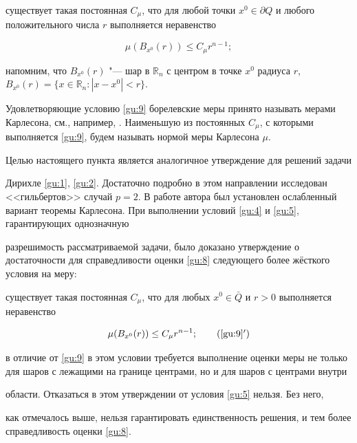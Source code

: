 существует такая постоянная $C_{\mu}$, что для любой точки $x^0 \in \partial Q$ и любого положительного числа $r$ выполняется неравенство

\begin{equation}

\mu (B_{x^0}(r)) \leq C_{\mu} r^{n-1}; 

\label{gu:9}

\end{equation}

напомним, что $B_{x^0}(r)$ "--- шар в ${\mathbb R}_n$ с центром в точке $x^0$ радиуса $r$, $B_{x^0}(r) = \{ x \in {\mathbb R}_n : |x - x^0| < r\}.$



Удовлетворяющие условию \eqref{gu:9} борелевские меры принято называть мерами Карлесона, см., например, \cite{Nik,Gar}. Наименьшую из постоянных $C_{\mu}$, с которыми выполняется \eqref{gu:9}, будем называть нормой меры Карлесона $\mu$.



Целью настоящего пункта является аналогичное утверждение для решений задачи

Дирихле \eqref{gu:1}, \eqref{gu:2}. Достаточно подробно в этом направлении исследован <<гильбертов>> случай $p = 2$. В работе автора \cite{G88} был установлен ослабленный вариант теоремы Карлесона. При выполнении условий \eqref{gu:4} и \eqref{gu:5}, гарантирующих однозначную

разрешимость рассматриваемой задачи, было доказано утверждение о достаточности для справедливости оценки \eqref{gu:8} следующего более жёсткого условия на меру:

существует такая постоянная $C_{\mu}$, что для любых $x^0 \in {\bar {Q}}$ и $r

> 0$ выполняется неравенство

\begin{equation}

\mu (B_{x^0}(r)) \leq C_{\mu} r^{n-1}; 

\tag{\ref{gu:9}$'$}

\label{gu:9'}

\end{equation}

в отличие от \eqref{gu:9} в этом условии требуется выполнение оценки меры не только для шаров с лежащими на границе центрами, но и для шаров с центрами внутри

области.  Отказаться в этом утверждении от условия \eqref{gu:5} нельзя. Без него,

как отмечалось выше, нельзя гарантировать единственность решения, и тем более  справедливость оценки \eqref{gu:8}. 



